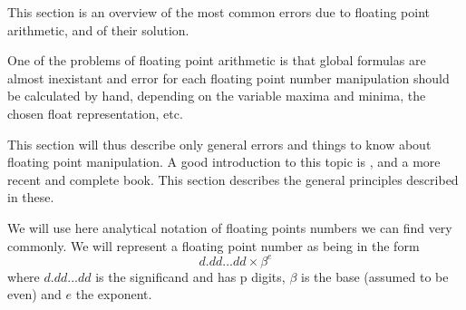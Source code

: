





This section is an overview of the most common errors due to floating point arithmetic, and of their solution.


One of the problems of floating point arithmetic is that global formulas are almost inexistant and error for each floating point number manipulation should be calculated by hand, depending on the variable maxima and minima, the chosen float representation, etc.

This section will thus describe only general errors and things to know about floating point manipulation. A good introduction to this topic is \cite{Goldberg}, and \cite{Higham} a more recent and complete book. This section describes the general principles described in these.


We will use here analytical notation of floating points numbers we can find very commonly. We will represent a floating point number as being in the form $$d.dd...dd\times\beta^e$$where $d.dd...dd$ is the significand and has p digits, $\beta$ is the base (assumed to be even) and $e$ the exponent.

